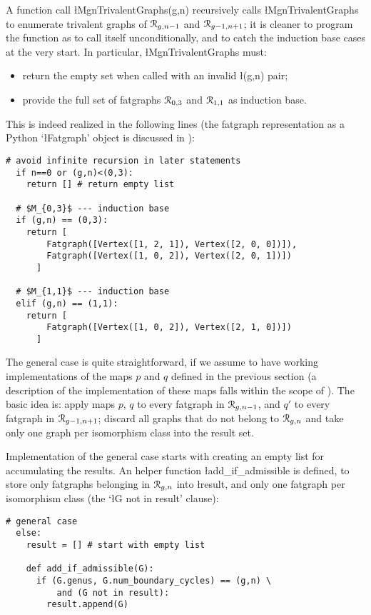 A function call \l{MgnTrivalentGraphs(g,n)} recursively calls
\l{MgnTrivalentGraphs} to enumerate trivalent graphs of $\mathcal{R}_{g,n-1}$
and $\mathcal{R}_{g-1,n+1}$; it is cleaner to program the function as to call itself
unconditionally, and to catch the induction base cases at the very
start.  In particular, \l{MgnTrivalentGraphs} must:
\begin{itemize}
\item return the empty set when called with an invalid \l{(g,n)} pair;
\item provide the full set of fatgraphs $\mathcal{R}_{0,3}$ and $\mathcal{R}_{1,1}$ as
  induction base.
\end{itemize}
This is indeed realized in the following lines (the fatgraph
representation as a Python `\l{Fatgraph}' object is discussed in
):
\begin{lstlisting}[name=MgnTrivalentGraphs,firstnumber=6]
  # avoid infinite recursion in later statements
  if n==0 or (g,n)<(0,3):
    return [] # return empty list

  # $M_{0,3}$ --- induction base
  if (g,n) == (0,3):
    return [ 
        Fatgraph([Vertex([1, 2, 1]), Vertex([2, 0, 0])]),
        Fatgraph([Vertex([1, 0, 2]), Vertex([2, 0, 1])]) 
      ]

  # $M_{1,1}$ --- induction base
  elif (g,n) == (1,1):
    return [ 
        Fatgraph([Vertex([1, 0, 2]), Vertex([2, 1, 0])]) 
      ]
\end{lstlisting}

The general case is quite straightforward, if we assume to have
working implementations of the maps $p$ and $q$ defined in the
previous section (a description of the implementation of these maps
falls within the scope of ).  The basic
idea is: apply maps $p$, $q$ to every fatgraph in $\mathcal{R}_{g,n-1}$, and
$q'$ to every fatgraph in $\mathcal{R}_{g-1,n+1}$; discard all graphs that do
not belong to $\mathcal{R}_{g,n}$ and take only one graph per isomorphism class
into the result set.

Implementation of the general case starts with creating an empty list
for accumulating the results.  An helper function
\l{add_if_admissible} is defined, to store only fatgraphs belonging in
$\mathcal{R}_{g,n}$ into \l{result}, and only one fatgraph per isomorphism
class (the `\l{G not in result}' clause):
\begin{lstlisting}[name=MgnTrivalentGraphs,firstnumber=22]
  # general case
  else:
    result = [] # start with empty list

    def add_if_admissible(G):
      if (G.genus, G.num_boundary_cycles) == (g,n) \
          and (G not in result):
        result.append(G)
      
\end{lstlisting}

